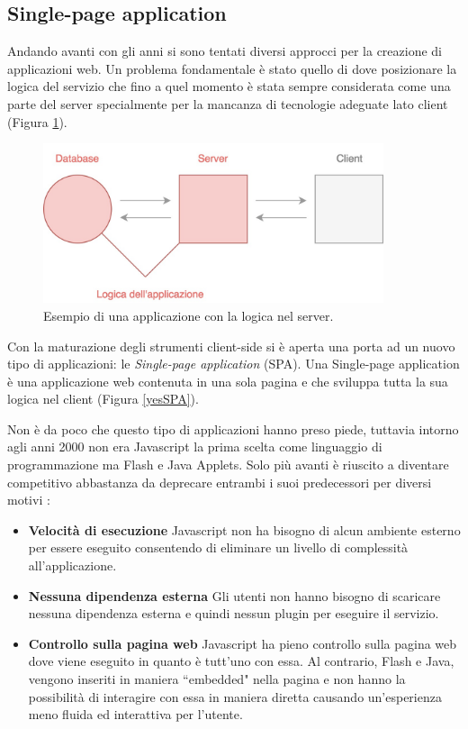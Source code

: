 \subsection{Single-page application}
Andando avanti con gli anni si sono tentati diversi approcci per la creazione di applicazioni web. Un problema fondamentale è stato quello di dove posizionare la logica del servizio che fino a quel momento è stata sempre considerata come una parte del server specialmente per la mancanza di tecnologie adeguate lato client (Figura \ref{noSPA}).

\begin{figure}[h]
\centering
\includegraphics[width=10cm]{./images/noSPA}
\caption{Esempio di una applicazione con la logica nel server.}
\label{noSPA}
\end{figure}

Con la maturazione degli strumenti client-side si è aperta una porta ad un nuovo tipo di applicazioni: le \textit{Single-page application} (SPA). Una Single-page application è una applicazione web contenuta in una sola pagina e che sviluppa tutta la sua logica nel client (Figura \ref{yesSPA}).

Non è da poco che questo tipo di applicazioni hanno preso piede, tuttavia intorno agli anni 2000 non era Javascript la prima scelta come linguaggio di programmazione ma Flash e Java Applets. Solo più avanti è riuscito a diventare competitivo abbastanza da deprecare entrambi i suoi predecessori per diversi motivi \cite{mikowski2013single}:

\begin{itemize}
    \item \textbf{Velocità di esecuzione} Javascript non ha bisogno di alcun ambiente esterno per essere eseguito consentendo di eliminare un livello di complessità all'applicazione.
    \item \textbf{Nessuna dipendenza esterna} Gli utenti non hanno bisogno di scaricare nessuna dipendenza esterna e quindi nessun plugin per eseguire il servizio.
    \item \textbf{Controllo sulla pagina web} Javascript ha pieno controllo sulla pagina web dove viene eseguito in quanto è tutt'uno con essa. Al contrario, Flash e Java, vengono inseriti in maniera “embedded" nella pagina e non hanno la possibilità di interagire con essa in maniera diretta causando un'esperienza meno fluida ed interattiva per l'utente.
\end{itemize}

